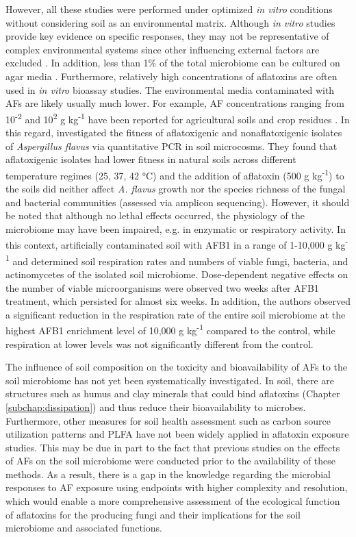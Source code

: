 However, all these studies were performed under optimized \textit{in vitro} conditions without considering soil as an environmental matrix. Although \textit{in vitro} studies provide key evidence on specific responses, they may not be representative of complex environmental systems since other influencing external factors are excluded \citep{drott2019fitness}. In addition, less than 1\% of the total microbiome can be cultured on agar media \citep{pham2012cultivation}. Furthermore, relatively high concentrations of aflatoxins are often used in \textit{in vitro} bioassay studies. The environmental media contaminated with AFs are likely usually much lower. For example, AF concentrations ranging from 10\textsuperscript{-2} and 10\textsuperscript{2} \textmu g kg\textsuperscript{-1} have been reported for agricultural soils and crop residues \citep{accinelli2008aspergillus}. In this regard, \citet{drott2019fitness} investigated the fitness of aflatoxigenic and nonaflatoxigenic isolates of \textit{Aspergillus flavus} via quantitative PCR in soil microcosms. They found that aflatoxigenic isolates had lower fitness in natural soils across different temperature regimes (25, 37, 42 °C) and the addition of aflatoxin (500 \textmu g kg\textsuperscript{-1}) to the soils did neither affect \textit{A. flavus} growth nor the species richness of the fungal and bacterial communities (assessed via amplicon sequencing). However, it should be noted that although no lethal effects occurred, the physiology of the microbiome may have been impaired, e.g. in enzymatic or respiratory activity. In this context, \citet{angle1981aflatoxin} artificially contaminated soil with AFB1 in a range of 1-10,000 \textmu g kg\textsuperscript{-1} and determined soil respiration rates and numbers of viable fungi, bacteria, and actinomycetes of the isolated soil microbiome. Dose-dependent negative effects on the number of viable microorganisms were observed two weeks after AFB1 treatment, which persisted for almost six weeks. In addition, the authors observed a significant reduction in the respiration rate of the entire soil microbiome at the highest AFB1 enrichment level of 10,000 \textmu g kg\textsuperscript{-1} compared to the control, while respiration at lower levels was not significantly different from the control. 


The influence of soil composition on the toxicity and bioavailability of AFs to the soil microbiome has not yet been systematically investigated. In soil, there are structures such as humus and clay minerals that could bind aflatoxins (Chapter \ref{subchap:dissipation}) and thus reduce their bioavailability to microbes. Furthermore, other measures for soil health assessment such as carbon source utilization patterns and PLFA have not been widely applied in aflatoxin exposure studies. This may be due in part to the fact that previous studies on the effects of AFs on the soil microbiome were conducted prior to the availability of these methods. As a result, there is a gap in the knowledge regarding the microbial responses to AF exposure using endpoints with higher complexity and resolution, which would enable a more comprehensive assessment of the ecological function of aflatoxins for the producing fungi and their implications for the soil microbiome and associated functions.


